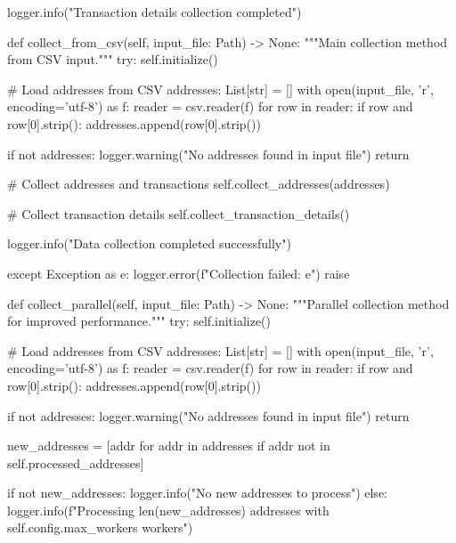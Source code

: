 \begin{codelisting}[language=Python, caption=Основной скрипт сбора данных]
        logger.info("Transaction details collection completed")
    
    def collect_from_csv(self, input_file: Path) -> None:
        """Main collection method from CSV input."""
        try:
            self.initialize()
            
            # Load addresses from CSV
            addresses: List[str] = []
            with open(input_file, 'r', encoding='utf-8') as f:
                reader = csv.reader(f)
                for row in reader:
                    if row and row[0].strip():
                        addresses.append(row[0].strip())
            
            if not addresses:
                logger.warning("No addresses found in input file")
                return
            
            # Collect addresses and transactions
            self.collect_addresses(addresses)
            
            # Collect transaction details
            self.collect_transaction_details()
            
            logger.info("Data collection completed successfully")
            
        except Exception as e:
            logger.error(f"Collection failed: {e}")
            raise
    
    def collect_parallel(self, input_file: Path) -> None:
        """Parallel collection method for improved performance."""
        try:
            self.initialize()
            
            # Load addresses from CSV
            addresses: List[str] = []
            with open(input_file, 'r', encoding='utf-8') as f:
                reader = csv.reader(f)
                for row in reader:
                    if row and row[0].strip():
                        addresses.append(row[0].strip())
            
            if not addresses:
                logger.warning("No addresses found in input file")
                return
            
            new_addresses = [addr for addr in addresses if addr not in self.processed_addresses]
            
            if not new_addresses:
                logger.info("No new addresses to process")
            else:
                logger.info(f"Processing {len(new_addresses)} addresses with {self.config.max_workers} workers")
                

\end{codelisting}
